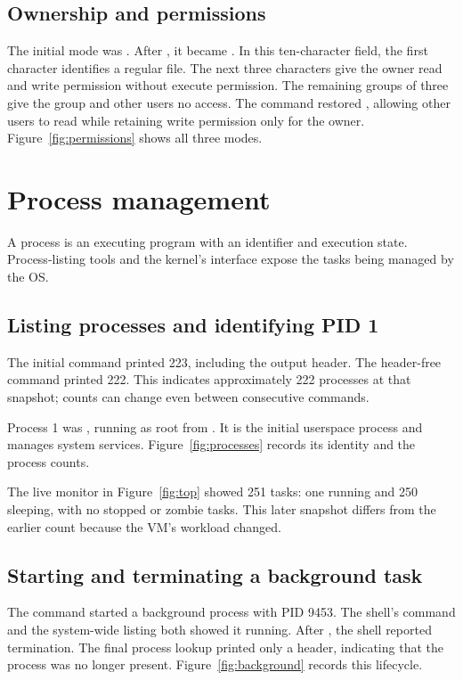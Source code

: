 \documentclass{../latex/utmreport}
\begin{document}
\section{Ownership and permissions}
The initial mode was . After
, it became . In this ten-character
field, the first character identifies a regular file. The next three characters
give the owner read and write permission without execute permission. The
remaining groups of three give the group and other users no access.
The command  restored , allowing
other users to read while retaining write permission only for the owner.
Figure~\ref{fig:permissions} shows all three modes.

\chapter{Process management}
A process is an executing program with an identifier and execution state.
Process-listing tools and the kernel's  interface expose the
tasks being managed by the OS.

\section{Listing processes and identifying PID 1}
The initial  command printed 223, including the output
header. The header-free command  printed
222. This indicates approximately 222 processes at that snapshot; counts can
change even between consecutive commands.

Process 1 was , running as root from
. It is the initial userspace process and
manages system services. Figure~\ref{fig:processes} records its identity and
the process counts.

The live monitor in Figure~\ref{fig:top} showed 251 tasks: one running and
250 sleeping, with no stopped or zombie tasks. This later snapshot differs
from the earlier  count because the VM's workload changed.

\section{Starting and terminating a background task}
The command  started a background process with PID 9453.
The shell's  command and the system-wide  listing both
showed it running. After , the shell reported termination.
The final process lookup printed only a header, indicating that the process
was no longer present. Figure~\ref{fig:background} records this lifecycle.
\end{document}
